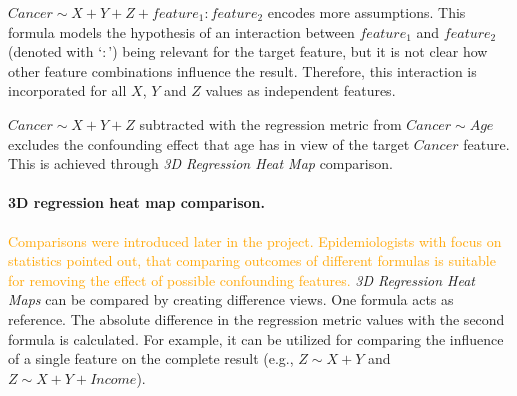 \documentclass[journal]{style/vgtc} 			          %
\newcommand{\design}[1]{\textcolor{orange}{#1}}
\begin{document}
$Cancer \sim X + Y + Z + feature_1:feature_2$ encodes more assumptions.
This formula models the hypothesis of an interaction between $feature_1$ and $feature_2$ (denoted with `$:$') being relevant for the target feature, but it is not clear how other feature combinations influence the result.
Therefore, this interaction is incorporated for all $X$, $Y$ and $Z$ values as independent features.

$Cancer \sim X + Y + Z$ subtracted with the regression metric from $Cancer \sim Age$ excludes the confounding effect that age has in view of the target $Cancer$ feature.
This is achieved through \emph{3D Regression Heat Map} comparison.

\paragraph{3D regression heat map comparison.}
\design{
Comparisons were introduced later in the project.
Epidemiologists with focus on statistics pointed out, that comparing outcomes of different formulas is suitable for removing the effect of possible confounding features.
}
\emph{3D Regression Heat Maps} can be compared by creating difference views.
One formula acts as reference.
The absolute difference in the regression metric values with the second formula is calculated. %
For example, it can be utilized for comparing the influence of a single feature on the complete result (e.g., $Z \sim X + Y$ and $Z \sim X + Y + Income$).
\end{document}
